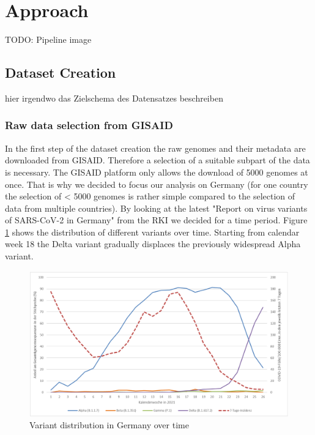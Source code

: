 \section{Approach} 
\label{approach}

TODO: Pipeline image

\subsection{Dataset Creation}  \label{ch:approachA}

hier irgendwo das Zielschema des Datensatzes beschreiben


\subsubsection{Raw data selection from GISAID}
\label{ch:approachAa}

In the first step of the dataset creation the raw genomes and their metadata are downloaded from \ac{GISAID}. Therefore a selection of a suitable subpart of the data is necessary. The \ac{GISAID} platform only allows the download of 5000 genomes at once. That is why we decided to focus our analysis on Germany (for one country the selection of < 5000 genomes is rather simple compared to the selection of data from multiple countries). By looking at the latest "Report on virus variants of SARS-CoV-2 in Germany" from the \ac{RKI} we decided for a time period. Figure \ref{rkiVariantDistribution} shows the distribution of different variants over time. Starting from calendar week 18 the Delta variant gradually displaces the previously widespread Alpha variant.

\begin{figure}[ht]
	\centering
	\includegraphics[width=1.0\linewidth]{figures/rkiVariantDistribution.png}
	\caption{Variant distribution in Germany over time \cite{robertkochinstituteditorBerichtVirusvariantenSARSCoV22021}}
	\label{rkiVariantDistribution}
\end{figure}


